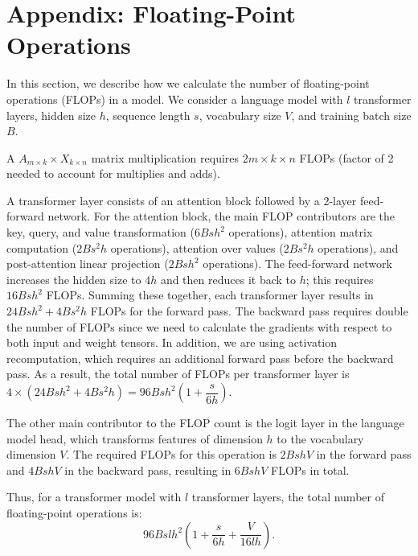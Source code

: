 \appendix

\section*{Appendix: Floating-Point Operations}
\label{sec:appendix}

In this section, we describe how we calculate the number of floating-point operations (FLOPs) in a model. We consider a language model with $l$ transformer layers, hidden size $h$, sequence length $s$, vocabulary size $V$, and training batch size $B$.

A $A_{m \times k} \times X_{k \times n}$ matrix multiplication requires $2m \times k \times n$ FLOPs (factor of 2 needed to account for multiplies and adds). 

A transformer layer consists of an attention block followed by a 2-layer feed-forward network. For the attention block, the main FLOP contributors are the key, query, and value transformation ($6Bsh^2$ operations), attention matrix computation ($2Bs^2h$ operations), attention over values ($2Bs^2h$ operations), and post-attention linear projection ($2Bsh^2$ operations). The feed-forward network increases the hidden size to $4h$ and then reduces it back to $h$; this requires $16Bsh^2$ FLOPs. Summing these together, each transformer layer results in $24Bsh^2 + 4Bs^2h$ FLOPs for the forward pass. The backward pass requires double the number of FLOPs since we need to calculate the gradients with respect to both input and weight tensors. In addition, we are using activation recomputation, which requires an additional forward pass before the backward pass. As a result, the total number of FLOPs per transformer layer is
$4 \times \left(24Bsh^2 + 4Bs^2h\right) = 96Bsh^2\left(1 + \dfrac{s}{6h}\right)$.

The other main contributor to the FLOP count is the logit layer in the language model head, which transforms features of dimension $h$ to the vocabulary dimension $V$. The required FLOPs for this operation is $2BshV$ in the forward pass and $4BshV$ in the backward pass, resulting in $6BshV$ FLOPs in total.

Thus, for a transformer model with $l$ transformer layers, the total number of floating-point operations is:
$$96Bslh^2\left(1 + \dfrac{s}{6h} + \dfrac{V}{16lh}\right).$$

